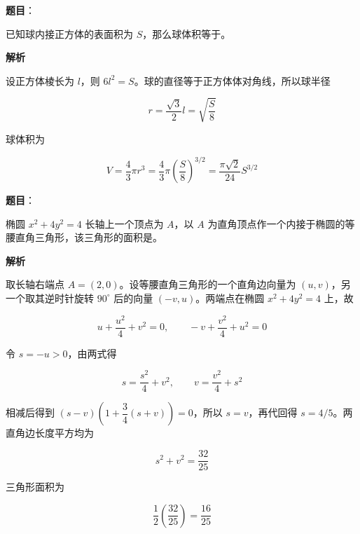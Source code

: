 \begin{answer}

\textbf{题目}：

已知球内接正方体的表面积为 $S$，那么球体积等于\gkblank{}。

\textbf{解析}

设正方体棱长为 $l$，则 $6l^2=S$。球的直径等于正方体体对角线，所以球半径

\nopagebreak[4]
\[
r=\frac{\sqrt3}{2}l=\sqrt{\frac S8}
\]

球体积为

\nopagebreak[4]
\[
V=\frac43\pi r^3
=\frac43\pi\left(\frac S8\right)^{3/2}
=\frac{\pi\sqrt2}{24}S^{3/2}
\]


\end{answer}
\begin{answer}

\textbf{题目}：

椭圆 $x^2+4y^2=4$ 长轴上一个顶点为 $A$，以 $A$ 为直角顶点作一个内接于椭圆的等腰直角三角形，该三角形的面积是\gkblank{}。

\textbf{解析}

取长轴右端点 $A=(2,0)$。设等腰直角三角形的一个直角边向量为 $(u,v)$，另一个取其逆时针旋转 $90^\circ$ 后的向量 $(-v,u)$。两端点在椭圆 $x^2+4y^2=4$ 上，故

\nopagebreak[4]
\[
u+\frac{u^2}{4}+v^2=0,\qquad
-v+\frac{v^2}{4}+u^2=0
\]

令 $s=-u>0$，由两式得

\nopagebreak[4]
\[
s=\frac{s^2}{4}+v^2,\qquad
v=\frac{v^2}{4}+s^2
\]

相减后得到 $(s-v)\left(1+\dfrac34(s+v)\right)=0$，所以 $s=v$，再代回得 $s=4/5$。两直角边长度平方均为

\nopagebreak[4]
\[
s^2+v^2=\frac{32}{25}
\]

三角形面积为

\nopagebreak[4]
\[
\frac12\left(\frac{32}{25}\right)=\frac{16}{25}
\]


\end{answer}
